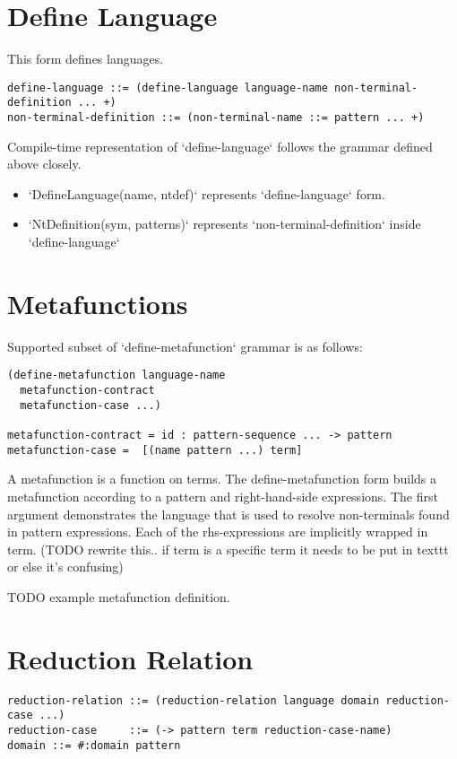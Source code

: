 \section{Define Language}

This form defines languages.

\begin{lstlisting}
define-language ::= (define-language language-name non-terminal-definition ... +)
non-terminal-definition ::= (non-terminal-name ::= pattern ... +)
\end{lstlisting}

Compile-time representation of `define-language` follows the grammar defined above closely. 

\begin{itemize}
\item
`DefineLanguage(name, ntdef)` represents `define-language` form. 
\item
`NtDefinition(sym, patterns)` represents `non-terminal-definition` inside `define-language`
\end{itemize}

\section{Metafunctions}
Supported subset of `define-metafunction` grammar is as follows:

\begin{lstlisting}
(define-metafunction language-name
  metafunction-contract
  metafunction-case ...)

metafunction-contract =	id : pattern-sequence ... -> pattern 
metafunction-case =  [(name pattern ...) term] 
\end{lstlisting}

A metafunction is a function on terms. The define-metafunction form builds a metafunction according to a pattern and right-hand-side expressions. The first argument demonstrates the language that is used to resolve non-terminals found in pattern expressions. Each of the rhs-expressions are implicitly wrapped in term. (TODO rewrite this.. if term is a specific term it needs to be put in texttt or else it's confusing)

TODO example metafunction definition.

\section{Reduction Relation}

\begin{lstlisting}
reduction-relation ::= (reduction-relation language domain reduction-case ...)
reduction-case     ::= (-> pattern term reduction-case-name)
domain ::= #:domain pattern
\end{lstlisting}

